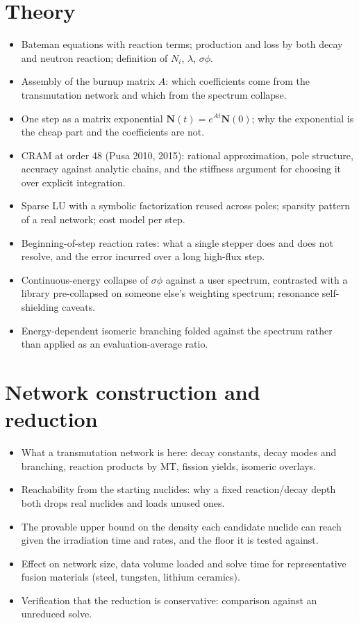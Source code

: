 \section{Theory}
\begin{itemize}
  \item Bateman equations with reaction terms; production and loss by both
        decay and neutron reaction; definition of $N_i$, $\lambda$,
        $\sigma\phi$.
  \item Assembly of the burnup matrix $A$: which coefficients come from the
        transmutation network and which from the spectrum collapse.
  \item One step as a matrix exponential $\mathbf{N}(t)=e^{At}\mathbf{N}(0)$;
        why the exponential is the cheap part and the coefficients are not.
  \item CRAM at order 48 (Pusa 2010, 2015): rational approximation, pole
        structure, accuracy against analytic chains, and the stiffness
        argument for choosing it over explicit integration.
  \item Sparse LU with a symbolic factorization reused across poles; sparsity
        pattern of a real network; cost model per step.
  \item Beginning-of-step reaction rates: what a single stepper does and does
        not resolve, and the error incurred over a long high-flux step.
  \item Continuous-energy collapse of $\sigma\phi$ against a user spectrum,
        contrasted with a library pre-collapsed on someone else's weighting
        spectrum; resonance self-shielding caveats.
  \item Energy-dependent isomeric branching folded against the spectrum
        rather than applied as an evaluation-average ratio.
\end{itemize}

\section{Network construction and reduction}
\begin{itemize}
  \item What a transmutation network is here: decay constants, decay modes
        and branching, reaction products by MT, fission yields, isomeric
        overlays.
  \item Reachability from the starting nuclides: why a fixed reaction/decay
        depth both drops real nuclides and loads unused ones.
  \item The provable upper bound on the density each candidate nuclide can
        reach given the irradiation time and rates, and the floor it is
        tested against.
  \item Effect on network size, data volume loaded and solve time for
        representative fusion materials (steel, tungsten, lithium ceramics).
  \item Verification that the reduction is conservative: comparison against
        an unreduced solve.
\end{itemize}

